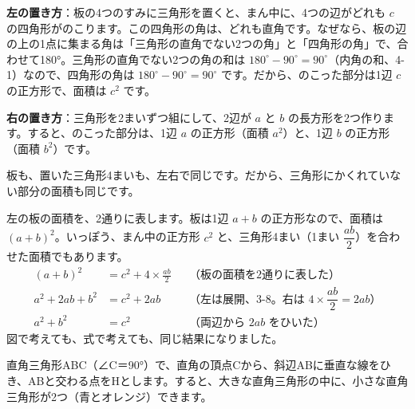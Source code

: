 \begin{enumerate}[label={\bkcircled[bkOrange]{\arabic*}}, leftmargin=2.4\zw, itemsep=2pt, topsep=2pt]
\item \textbf{左の置き方}：板の4つのすみに三角形を置くと、まん中に、4つの辺がどれも $c$ の四角形がのこります。この四角形の角は、どれも直角です。なぜなら、板の辺の上の1点に集まる角は「三角形の直角でない2つの角」と「四角形の角」で、合わせて180°。三角形の直角でない2つの角の和は $180^\circ-90^\circ=90^\circ$（内角の和、4-1）なので、四角形の角は $180^\circ-90^\circ=90^\circ$ です。だから、のこった部分は1辺 $c$ の正方形で、面積は $c^2$ です。
\item \textbf{右の置き方}：三角形を2まいずつ組にして、2辺が $a$ と $b$ の長方形を2つ作ります。すると、のこった部分は、1辺 $a$ の正方形（面積 $a^2$）と、1辺 $b$ の正方形（面積 $b^2$）です。
\item 板も、置いた三角形4まいも、左右で同じです。だから、三角形にかくれていない部分の面積も同じです。
\end{enumerate}

左の板の面積を、2通りに表します。板は1辺 $a+b$ の正方形なので、面積は $(a+b)^2$。いっぽう、まん中の正方形 $c^2$ と、三角形4まい（1まい $\dfrac{ab}{2}$）を合わせた面積でもあります。
\begin{align*}
(a+b)^2&=c^2+4\times\frac{ab}{2}&&\text{（板の面積を2通りに表した）}\\
a^2+2ab+b^2&=c^2+2ab&&\text{（左は展開、3-8。右は $4\times\dfrac{ab}{2}=2ab$）}\\
a^2+b^2&=c^2&&\text{（両辺から $2ab$ をひいた）}
\end{align*}
図で考えても、式で考えても、同じ結果になりました。


直角三角形ABC（∠C＝90°）で、直角の頂点Cから、斜辺ABに垂直な線をひき、ABと交わる点をHとします。すると、大きな直角三角形の中に、小さな直角三角形が2つ（青とオレンジ）できます。

